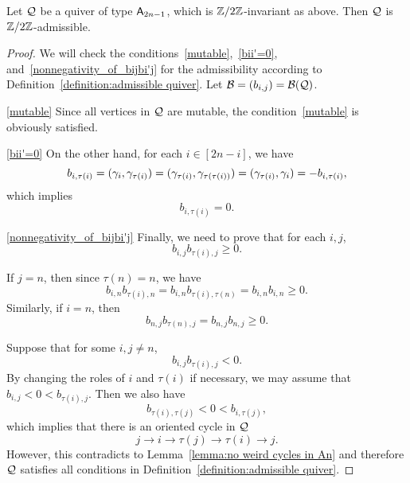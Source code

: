 \begin{proposition}\label{proposition:admissibility for An}
Let $\mathcal{Q}$ be a quiver of type $\mathsf{A}_{2n-1}$, which is $\mathbb{Z}/2\mathbb{Z}$-invariant as above. Then $\mathcal{Q}$ is $\mathbb{Z}/2\mathbb{Z}$-admissible.
\end{proposition}
\begin{proof}
We will check the conditions~\eqref{mutable},~\eqref{bii'=0}, and~\eqref{nonnegativity_of_bijbi'j} for the admissibility according to Definition~\ref{definition:admissible quiver}.
Let $\mathcal{B} = (b_{i,j}) = \mathcal{B}(\mathcal{Q})$. 

\noindent \eqref{mutable} Since all vertices in $\mathcal{Q}$ are mutable, the condition~\eqref{mutable} is obviously satisfied.

\noindent \eqref{bii'=0} On the other hand, for each $i\in[2n-i]$, we have 
\[
b_{i,\tau(i)}=(\gamma_i, \gamma_{\tau(i)})= (\gamma_{\tau(i)}, \gamma_{\tau(\tau(i))}) = (\gamma_{\tau(i)}, \gamma_i) = -b_{i,\tau(i)},
\]
which implies  
\[
b_{i,\tau(i)}=0.
\]

\noindent \eqref{nonnegativity_of_bijbi'j} Finally, we need to prove that for each $i, j$,
\[
b_{i,j}b_{\tau(i),j}\ge 0.
\]

If $j=n$, then since $\tau(n)=n$, we have
\[
b_{i,n}b_{\tau(i),n}=b_{i,n}b_{\tau(i),\tau(n)} = b_{i,n}b_{i,n}\ge 0.
\]
Similarly, if $i=n$, then 
\[
b_{n, j}b_{\tau(n),j} = b_{n,j}b_{n,j}\ge 0.
\]

Suppose that for some $i, j\neq n$,
\[
b_{i,j}b_{\tau(i),j}<0.
\]
By changing the roles of $i$ and $\tau(i)$ if necessary, we may assume that $b_{i,j}<0<b_{\tau(i),j}$.
Then we also have
\[
b_{\tau(i),\tau(j)}<0<b_{i,\tau(j)},
\]
which implies that there is an oriented cycle in $\mathcal{Q}$
\[
j\to i \to \tau(j) \to \tau(i) \to j.
\]
However, this contradicts to Lemma~\ref{lemma:no weird cycles in An} and therefore $\mathcal{Q}$ satisfies all conditions in Definition~\ref{definition:admissible quiver}.
\end{proof}


